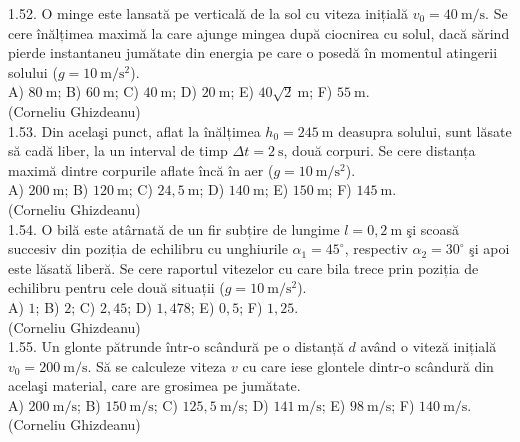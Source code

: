 1.52. O minge este lansată pe verticală de la sol cu viteza inițială $v_{0}=40 \mathrm{~m} / \mathrm{s}$. Se cere înălțimea maximă la care ajunge mingea după ciocnirea cu solul, dacă sărind pierde instantaneu jumătate din energia pe care o posedă în momentul atingerii solului ($g=10 \mathrm{~m} / \mathrm{s}^{2}$).\\ A) $80 \mathrm{~m}$; B) $60 \mathrm{~m}$; C) $40 \mathrm{~m}$; D) $20 \mathrm{~m}$; E) $40 \sqrt{2} \mathrm{~m}$; F) $55 \mathrm{~m}$.\\ (Corneliu Ghizdeanu)\\

1.53. Din acelaşi punct, aflat la înălțimea $h_{0}=245 \mathrm{~m}$ deasupra solului, sunt lăsate să cadă liber, la un interval de timp $\Delta t=2 \mathrm{~s}$, două corpuri. Se cere distanța maximă dintre corpurile aflate încă în aer ($g=10 \mathrm{~m} / \mathrm{s}^{2}$).\\ A) $200 \mathrm{~m}$; B) $120 \mathrm{~m}$; C) $24,5 \mathrm{~m}$; D) $140 \mathrm{~m}$; E) $150 \mathrm{~m}$; F) $145 \mathrm{~m}$.\\ (Corneliu Ghizdeanu)\\

1.54. O bilă este atârnată de un fir subțire de lungime $l=0,2 \mathrm{~m}$ şi scoasă succesiv din poziția de echilibru cu unghiurile $\alpha_{1}=45^{\circ}$, respectiv $\alpha_{2}=30^{\circ}$ şi apoi este lăsată liberă. Se cere raportul vitezelor cu care bila trece prin poziția de echilibru pentru cele două situații ($g=10 \mathrm{~m} / \mathrm{s}^{2}$).\\ A) $1$; B) $2$; C) $2,45$; D) $1,478$; E) $0,5$; F) $1,25$.\\ (Corneliu Ghizdeanu)\\

1.55. Un glonte pătrunde într-o scândură pe o distanță $d$ având o viteză inițială $v_{0}=200 \mathrm{~m} / \mathrm{s}$. Să se calculeze viteza $v$ cu care iese glontele dintr-o scândură din acelaşi material, care are grosimea pe jumătate.\\ A) $200 \mathrm{~m} / \mathrm{s}$; B) $150 \mathrm{~m} / \mathrm{s}$; C) $125,5 \mathrm{~m} / \mathrm{s}$; D) $141 \mathrm{~m} / \mathrm{s}$; E) $98 \mathrm{~m} / \mathrm{s}$; F) $140 \mathrm{~m} / \mathrm{s}$.\\ (Corneliu Ghizdeanu)\\

